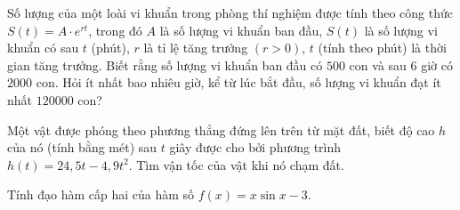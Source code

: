 \begin{bt}%
	Số lượng của một loài vi khuẩn trong phòng thí nghiệm được tính theo công thức $S(t) = A \cdot e^{rt}$, trong đó $A$ là số lượng vi khuẩn ban đầu, $S(t)$ là số lượng vi khuẩn có sau $t$ (phút), $r$ là tỉ lệ tăng trưởng $\left(r>0 \right)$, $t$ (tính theo phút) là thời gian tăng trưởng. Biết rằng số lượng vi khuẩn ban đầu có $500$ con và sau $6$ giờ có $2000$ con. Hỏi ít nhất bao nhiêu giờ, kể từ lúc bắt đầu, số lượng vi khuẩn đạt ít nhất $120000$ con?
\end{bt} 
\begin{bt}%
	Một vật được phóng theo phương thẳng đứng lên trên từ mặt đất, biết độ cao $h$ của nó (tính bằng mét) sau $t$ giây được cho bởi phương trình $h(t) = 24{,}5 t - 4{,}9 t^2$. Tìm vận tốc của vật khi nó chạm đất.
\end{bt} 
\begin{bt}%
	Tính đạo hàm cấp hai của hàm số $f(x) = x\sin{x} - 3$.
\end{bt} 
